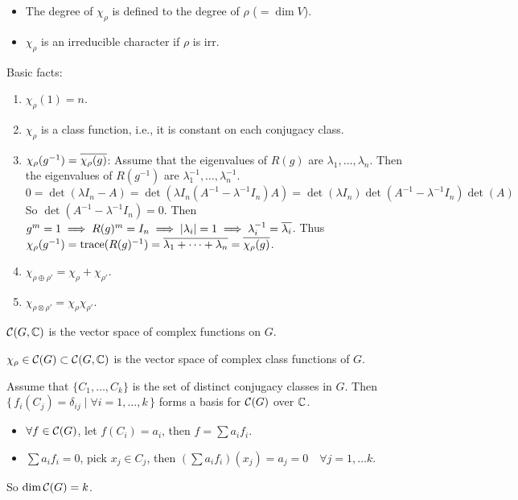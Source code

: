 \begin{definition}\mbox{}
  \begin{itemize}
    \item The degree of $\chi_\rho$ is defined to the degree of $\rho$
      ($ =\dim V$).
    \item $\chi_\rho$ is an irreducible character if $\rho$ is irr.
  \end{itemize}
\end{definition}

Basic facts:
\begin{enumerate}
  \item $\chi_\rho(1) = n$.
  \item $\chi_\rho$ is a class function, i.e., it is constant on each
    conjugacy class.
  \item $\chi_\rho(g^{-1}) = \overline{\chi_\rho(g)}$: Assume that the eigenvalues
    of $R(g)$ are $\lambda_1, \dots, \lambda_n$. Then the eigenvalues of
    $R(g^{-1})$ are $\lambda_1^{-1}, \dots, \lambda_n^{-1}$.
    \[
      0 = \det(\lambda I_n - A) =
      \det(\lambda I_n (A^{-1} - \lambda^{-1}I_n) A) =
      \det(\lambda I_n) \det(A^{-1} - \lambda^{-1} I_n) \det(A)
    \]
    So $\det(A^{-1} - \lambda^{-1} I_n) = 0$.
    Then $g^m = 1 \implies R(g)^m = I_n \implies \lvert\lambda_i\rvert = 1
    \implies \lambda_i^{-1} = \overline{\lambda_i}$. Thus
    $\chi_\rho(g^{-1}) = \operatorname{trace}(R(g)^{-1}) =
    \overline{\lambda_1 + \dots + \lambda_n} = \overline{\chi_\rho(g)}$.
  \item $\chi_{\rho \oplus \rho'} = \chi_{\rho} + \chi_{\rho'}$.
  \item $\chi_{\rho \otimes \rho'} = \chi_{\rho} \chi_{\rho'}$.
\end{enumerate}


\begin{definition}
  $\mathcal{C}(G, \mathbb{C})$ is the vector space of complex functions on $G$.

  $\chi_\rho \in \mathcal{C}(G) \subset \mathcal{C}(G, \mathbb{C})$
  is the vector space of complex class functions of $G$.
\end{definition}


\begin{remark}
  Assume that $\{ C_1, \dots, C_k \}$ is the set of distinct conjugacy classes
  in $G$.
  Then $\{\, f_i(C_j) = \delta_{ij} \mid \forall i = 1, \dots, k \,\}$ forms
  a basis for $\mathcal{C}(G)$ over $\mathbb{C}$.
  \begin{itemize}
    \item $\forall f \in \mathcal{C}(G)$, let $f(C_i) = a_i$, then
      $f = \sum a_i f_i$.
    \item $\sum a_i f_i = 0$, pick $x_j \in C_j$, then
      $(\sum a_if_i)(x_j) = a_j = 0 \quad \forall j = 1, \dots k$.
  \end{itemize}
  So $\dim \mathcal{C}(G) = k$.
\end{remark}

